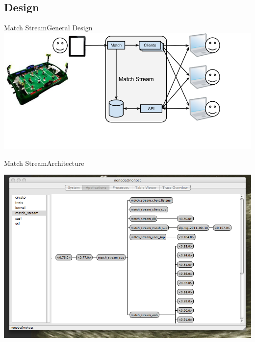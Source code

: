 \documentclass[utf8]{beamer}
\begin{document}
\subsection{Design}
\begin{frame}{Match Stream}{General Design}
	\includegraphics[width=\textwidth]{img/MatchStream.png}
\end{frame}
\begin{frame}{Match Stream}{Architecture}
	\begin{center}
		\includegraphics[height=.75\textheight]{img/running.png}
	\end{center}
\end{frame}
\end{document}
